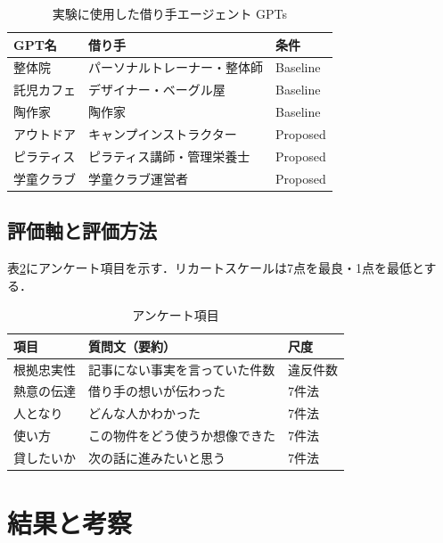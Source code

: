 \documentclass[dvipdfmx]{FITpaper}
\begin{document}
\begin{table}[t]
  \centering
  \caption{実験に使用した借り手エージェント GPTs}
  \label{tab:gpts}
  \small
  \begin{tabular}{llp{1.55cm}}
    \toprule
    GPT名 & 借り手 & 条件 \\
    \midrule
    整体院 & パーソナルトレーナー・整体師 & Baseline \\
    託児カフェ & デザイナー・ベーグル屋 & Baseline \\
    陶作家 & 陶作家 & Baseline \\
    アウトドア & キャンプインストラクター & Proposed \\
    ピラティス & ピラティス講師・管理栄養士 & Proposed \\
    学童クラブ & 学童クラブ運営者 & Proposed \\
    \bottomrule
  \end{tabular}
\end{table}

\subsection{評価軸と評価方法}

表\ref{tab:survey}にアンケート項目を示す．リカートスケールは7点を最良・1点を最低とする．

\begin{table}[h]
  \centering
  \caption{アンケート項目}
  \label{tab:survey}
  \begin{tabular}{lp{3.2cm}l}
    \toprule
    項目 & 質問文（要約） & 尺度 \\
    \midrule
    根拠忠実性 & 記事にない事実を言っていた件数 & 違反件数 \\
    熱意の伝達 & 借り手の想いが伝わった & 7件法 \\
    人となり & どんな人かわかった & 7件法 \\
    使い方 & この物件をどう使うか想像できた & 7件法 \\
    貸したいか & 次の話に進みたいと思う & 7件法 \\
    \bottomrule
  \end{tabular}
\end{table}

\section{結果と考察}
\end{document}
